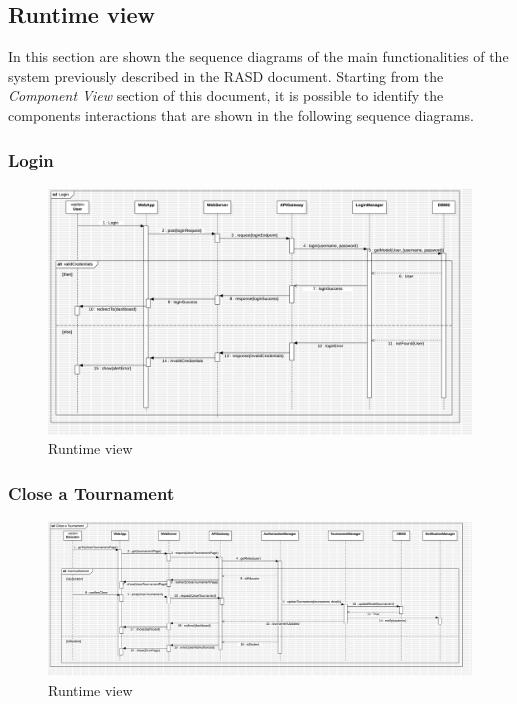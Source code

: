 \subsection{Runtime view}
In this section are shown the sequence diagrams of the main functionalities of the system previously described in the RASD document. Starting from the \textit{Component View} section of this document, it is possible to identify the components interactions that are shown in the following sequence diagrams.

\subsubsection*{Login}
\begin{figure}[H]
    \centering
    \includegraphics[width=\textwidth]{Diagrams/LoginSD.jpg}
    \caption{Runtime view}
    \label{fig:runtime_view}
\end{figure}

\subsubsection*{Close a Tournament}
\begin{figure}[H]
    \centering
    \includegraphics[width=\textwidth]{Diagrams/CloseTournamentSD.jpg}
    \caption{Runtime view}
    \label{fig:runtime_view}
\end{figure}

